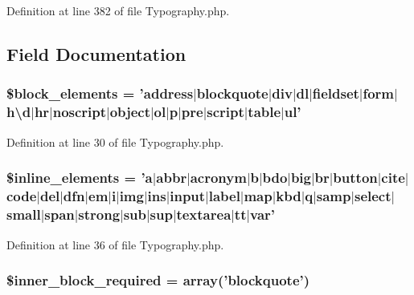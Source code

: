 Definition at line 382 of file Typography.\-php.



\subsection{Field Documentation}
\hypertarget{class_c_i___typography_ac99f5bbe8e02dc1147e9a4205dc161eb}{
\subsubsection[{\$block\-\_\-elements}]{\setlength{\rightskip}{0pt plus 5cm}\$block\-\_\-elements = 'address$|$blockquote$|${\bf div}$|$dl$|$fieldset$|$form$|${\bf h\textbackslash{}d}$|$hr$|$noscript$|$object$|$ol$|$p$|$pre$|$script$|$table$|$ul'}}\label{class_c_i___typography_ac99f5bbe8e02dc1147e9a4205dc161eb}


Definition at line 30 of file Typography.\-php.

\hypertarget{class_c_i___typography_a7ee5f0598125dc7e6b17a08aa6da384f}{
\subsubsection[{\$inline\-\_\-elements}]{\setlength{\rightskip}{0pt plus 5cm}\$inline\-\_\-elements = '{\bf a}$|$abbr$|$acronym$|${\bf b}$|$bdo$|$big$|$br$|${\bf button}$|$cite$|$code$|$del$|$dfn$|$em$|$i$|$img$|$ins$|$input$|$label$|$map$|$kbd$|$q$|$samp$|$select$|$small$|$span$|$strong$|${\bf sub}$|${\bf sup}$|$textarea$|$tt$|$var'}}\label{class_c_i___typography_a7ee5f0598125dc7e6b17a08aa6da384f}


Definition at line 36 of file Typography.\-php.

\hypertarget{class_c_i___typography_a822eaf22f556c5c52bd766779d9ee22f}{
\subsubsection[{\$inner\-\_\-block\-\_\-required}]{\setlength{\rightskip}{0pt plus 5cm}\$inner\-\_\-block\-\_\-required = array('blockquote')}}\label{class_c_i___typography_a822eaf22f556c5c52bd766779d9ee22f}


